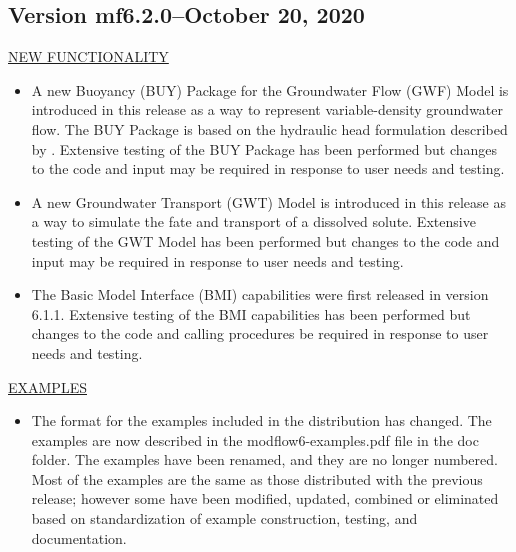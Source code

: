 	\subsection{Version mf6.2.0--October 20, 2020}
	
	\underline{NEW FUNCTIONALITY}
	\begin{itemize}
	        \item A new Buoyancy (BUY) Package for the Groundwater Flow (GWF) Model is introduced in this release as a way to represent variable-density groundwater flow.  The BUY Package is based on the hydraulic head formulation described by \cite{langevin2020hydraulic}.  Extensive testing of the BUY Package has been performed but changes to the code and input may be required in response to user needs and testing.   
		\item A new Groundwater Transport (GWT) Model is introduced in this release as a way to simulate the fate and transport of a dissolved solute.  Extensive testing of the GWT Model has been performed but changes to the code and input may be required in response to user needs and testing. 
		\item The Basic Model Interface (BMI) capabilities were first released in version 6.1.1.  Extensive testing of the BMI capabilities has been performed but changes to the code and calling procedures be required in response to user needs and testing.
	\end{itemize}
	
	\underline{EXAMPLES}
	\begin{itemize}
	\item The format for the examples included in the distribution has changed.  The examples are now described in the modflow6-examples.pdf file in the doc folder.  The examples have been renamed, and they are no longer numbered.  Most of the examples are the same as those distributed with the previous release; however some have been modified, updated, combined or eliminated based on standardization of example construction, testing, and documentation.  
	\end{itemize}

